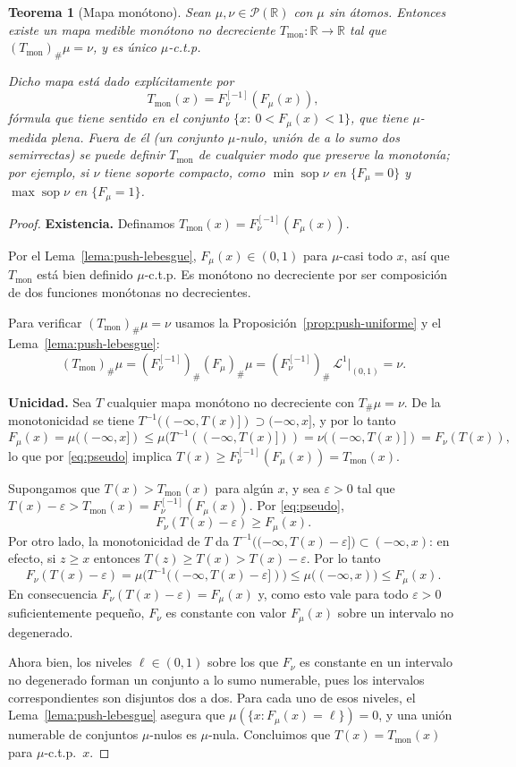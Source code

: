 \documentclass[12pt, a4paper]{amsbook}
\def\sop{\operatorname {\mathrm{sop}}}
\newcommand{\R}{{\mathbb R}}
\newtheorem{teo}{Teorema}[section]
\theoremstyle{remark}
\theoremstyle{definition}
\numberwithin{section}{chapter}
\numberwithin{subsection}{section}
\numberwithin{equation}{section}
\numberwithin{figure}{chapter}
\begin{document}
\begin{teo}[Mapa monótono]\label{teo:mapa-monotono}
Sean $\mu,\nu\in\mathcal P(\R)$ con $\mu$ sin átomos. Entonces existe un
mapa medible monótono no decreciente $T_\text{mon}\colon\R\to\R$ tal que
$(T_\text{mon})_\#\mu=\nu$, y es único $\mu$-c.t.p.

Dicho mapa está dado explícitamente por
\[
T_\text{mon}(x)=F_\nu^{[-1]}(F_\mu(x)),
\]
fórmula que tiene sentido en el conjunto $\{x:\ 0<F_\mu(x)<1\}$, que tiene
$\mu$-medida plena. Fuera de él (un conjunto $\mu$-nulo, unión de a lo sumo
dos semirrectas) se puede definir $T_\text{mon}$ de cualquier modo que
preserve la monotonía; por ejemplo, si $\nu$ tiene soporte compacto, como
$\min\sop\nu$ en $\{F_\mu=0\}$ y $\max\sop\nu$ en $\{F_\mu=1\}$.
\end{teo}
\begin{proof}
\textbf{Existencia.} Definamos $T_\text{mon}(x)=F_\nu^{[-1]}(F_\mu(x))$.

Por el Lema~\ref{lema:push-lebesgue}, $F_\mu(x)\in(0,1)$ para $\mu$-casi todo
$x$, así que $T_\text{mon}$ está bien definido $\mu$-c.t.p. Es monótono no decreciente
por ser composición de dos funciones monótonas no decrecientes.

Para verificar $(T_\text{mon})_\#\mu=\nu$ usamos la Proposición~\ref{prop:push-uniforme}
y el Lema~\ref{lema:push-lebesgue}:
\[
(T_\text{mon})_\#\mu
=(F_\nu^{[-1]})_\#(F_\mu)_\#\mu
=(F_\nu^{[-1]})_\#\,\mathcal L^1|_{(0,1)}
=\nu.
\]

\textbf{Unicidad.} Sea $T$ cualquier mapa monótono no decreciente con $T_\#\mu=\nu$.
De la monotonicidad se tiene $T^{-1}((-\infty,T(x)])\supset(-\infty,x]$, y por lo tanto
\[
F_\mu(x)=\mu((-\infty,x])\le\mu(T^{-1}((-\infty,T(x)]))=\nu((-\infty,T(x)])=F_\nu(T(x)),
\]
lo que por \eqref{eq:pseudo} implica $T(x)\ge F_\nu^{[-1]}(F_\mu(x))=T_\text{mon}(x)$.

Supongamos que $T(x)>T_\text{mon}(x)$ para algún $x$, y sea $\varepsilon>0$ tal que
$T(x)-\varepsilon>T_\text{mon}(x)=F_\nu^{[-1]}(F_\mu(x))$. Por \eqref{eq:pseudo},
\[
F_\nu(T(x)-\varepsilon)\ge F_\mu(x).
\]
Por otro lado, la monotonicidad de $T$ da
$T^{-1}\bigl((-\infty,T(x)-\varepsilon]\bigr)\subset(-\infty,x)$: en efecto, si
$z\ge x$ entonces $T(z)\ge T(x)>T(x)-\varepsilon$. Por lo tanto
\[
F_\nu(T(x)-\varepsilon)
=\mu\bigl(T^{-1}((-\infty,T(x)-\varepsilon])\bigr)
\le\mu\bigl((-\infty,x)\bigr)
\le F_\mu(x).
\]
En consecuencia $F_\nu(T(x)-\varepsilon)=F_\mu(x)$ y, como esto vale para todo
$\varepsilon>0$ suficientemente pequeño, $F_\nu$ es constante con valor $F_\mu(x)$
sobre un intervalo no degenerado.

Ahora bien, los niveles $\ell\in(0,1)$ sobre los que $F_\nu$ es constante en un
intervalo no degenerado forman un conjunto a lo sumo numerable, pues los intervalos
correspondientes son disjuntos dos a dos. Para cada uno de esos niveles, el
Lema~\ref{lema:push-lebesgue} asegura que $\mu(\{x:F_\mu(x)=\ell\})=0$, y una unión
numerable de conjuntos $\mu$-nulos es $\mu$-nula. Concluimos que
$T(x)=T_\text{mon}(x)$ para $\mu$-c.t.p.\ $x$.
\end{proof}
\end{document}
